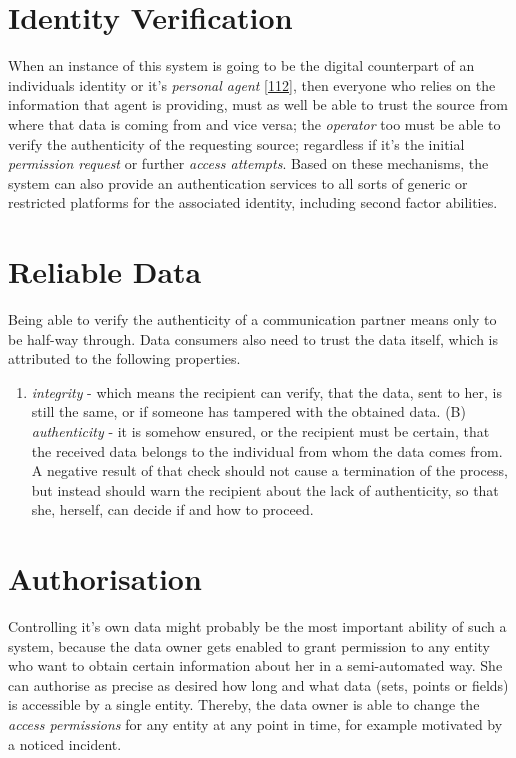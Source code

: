\documentclass[12pt,english,a4paper,titlepage,cleardoublepage=empty,dottedtoc]{report}
\providecommand{\tightlist}{%
  \setlength{\itemsep}{0pt}\setlength{\parskip}{0pt}}
\begin{document}
\section{Identity Verification}\label{identity-verification}

When an instance of this system is going to be the digital counterpart
of an individuals identity or it's \emph{personal agent}
{[}\protect\hyperlink{ref-book_2015_ethical-it-innovation}{112}{]}, then
everyone who relies on the information that agent is providing, must as
well be able to trust the source from where that data is coming from and
vice versa; the \emph{operator} too must be able to verify the
authenticity of the requesting source; regardless if it's the initial
\emph{permission request} or further \emph{access attempts}. Based on
these mechanisms, the system can also provide an authentication services
to all sorts of generic or restricted platforms for the associated
identity, including second factor abilities.

\section{Reliable Data}\label{reliable-data}

Being able to verify the authenticity of a communication partner means
only to be half-way through. Data consumers also need to trust the data
itself, which is attributed to the following properties.

\begin{enumerate}
\def\labelenumi{(\Alph{enumi})}
\tightlist
\item
  \emph{integrity} - which means the recipient can verify, that the
  data, sent to her, is still the same, or if someone has tampered with
  the obtained data. (B) \emph{authenticity} - it is somehow ensured, or
  the recipient must be certain, that the received data belongs to the
  individual from whom the data comes from. A negative result of that
  check should not cause a termination of the process, but instead
  should warn the recipient about the lack of authenticity, so that she,
  herself, can decide if and how to proceed.
\end{enumerate}

\section{Authorisation}\label{authorisation}

Controlling it's own data might probably be the most important ability
of such a system, because the data owner gets enabled to grant
permission to any entity who want to obtain certain information about
her in a semi-automated way. She can authorise as precise as desired how
long and what data (sets, points or fields) is accessible by a single
entity. Thereby, the data owner is able to change the \emph{access
permissions} for any entity at any point in time, for example motivated
by a noticed incident.
\end{document}
